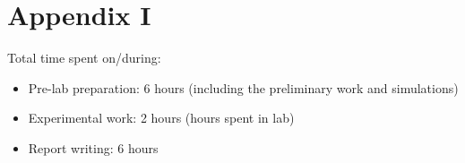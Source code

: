 \documentclass[letterpaper,12pt]{article}
\begin{document}
\section*{Appendix I}
Total time spent on/during:
\begin{itemize}
	\item Pre-lab preparation: 6 hours (including the preliminary work and simulations) 
	\item Experimental work: 2 hours (hours spent in lab)
	\item Report writing: 6 hours 
\end{itemize}



\end{document}

